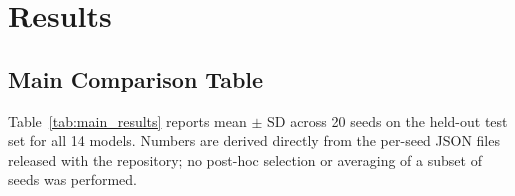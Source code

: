 \documentclass[a4paper,fleqn]{cas-sc}
\begin{document}
\section{Results}
\label{sec:results}

\subsection{Main Comparison Table}
\label{sec:results_main}

Table~\ref{tab:main_results} reports mean $\pm$ SD across 20 seeds on the
held-out test set for all 14 models.
Numbers are derived directly from the per-seed JSON files released with
the repository; no post-hoc selection or averaging of a subset of seeds was
performed.
\end{document}
